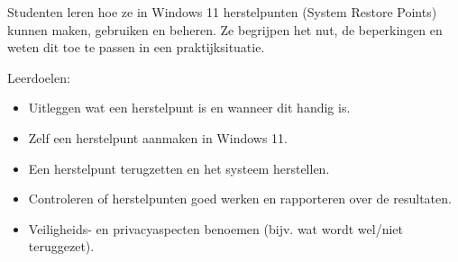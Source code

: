 Studenten leren hoe ze in Windows 11 herstelpunten (System Restore Points) kunnen maken, gebruiken en beheren. Ze begrijpen het nut, de beperkingen en weten dit toe te passen in een praktijksituatie.

Leerdoelen:
\begin{itemize}
\item Uitleggen wat een herstelpunt is en wanneer dit handig is.
\item Zelf een herstelpunt aanmaken in Windows 11.
\item Een herstelpunt terugzetten en het systeem herstellen.
\item Controleren of herstelpunten goed werken en rapporteren over de resultaten.
\item Veiligheids- en privacyaspecten benoemen (bijv. wat wordt wel/niet teruggezet).
\end{itemize}

